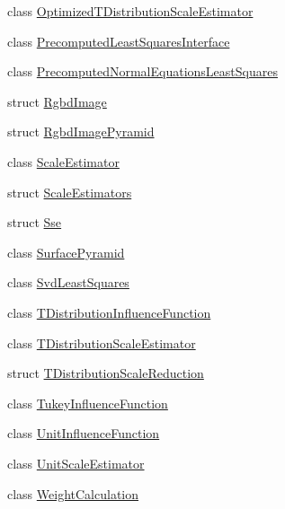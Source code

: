 \begin{DoxyCompactItemize}
\item 
class \mbox{\hyperlink{classdvo_1_1core_1_1_optimized_t_distribution_scale_estimator}{Optimized\+T\+Distribution\+Scale\+Estimator}}
\item 
class \mbox{\hyperlink{classdvo_1_1core_1_1_precomputed_least_squares_interface}{Precomputed\+Least\+Squares\+Interface}}
\item 
class \mbox{\hyperlink{classdvo_1_1core_1_1_precomputed_normal_equations_least_squares}{Precomputed\+Normal\+Equations\+Least\+Squares}}
\item 
struct \mbox{\hyperlink{structdvo_1_1core_1_1_rgbd_image}{Rgbd\+Image}}
\item 
struct \mbox{\hyperlink{structdvo_1_1core_1_1_rgbd_image_pyramid}{Rgbd\+Image\+Pyramid}}
\item 
class \mbox{\hyperlink{classdvo_1_1core_1_1_scale_estimator}{Scale\+Estimator}}
\item 
struct \mbox{\hyperlink{structdvo_1_1core_1_1_scale_estimators}{Scale\+Estimators}}
\item 
struct \mbox{\hyperlink{structdvo_1_1core_1_1_sse}{Sse}}
\item 
class \mbox{\hyperlink{classdvo_1_1core_1_1_surface_pyramid}{Surface\+Pyramid}}
\item 
class \mbox{\hyperlink{classdvo_1_1core_1_1_svd_least_squares}{Svd\+Least\+Squares}}
\item 
class \mbox{\hyperlink{classdvo_1_1core_1_1_t_distribution_influence_function}{T\+Distribution\+Influence\+Function}}
\item 
class \mbox{\hyperlink{classdvo_1_1core_1_1_t_distribution_scale_estimator}{T\+Distribution\+Scale\+Estimator}}
\item 
struct \mbox{\hyperlink{structdvo_1_1core_1_1_t_distribution_scale_reduction}{T\+Distribution\+Scale\+Reduction}}
\item 
class \mbox{\hyperlink{classdvo_1_1core_1_1_tukey_influence_function}{Tukey\+Influence\+Function}}
\item 
class \mbox{\hyperlink{classdvo_1_1core_1_1_unit_influence_function}{Unit\+Influence\+Function}}
\item 
class \mbox{\hyperlink{classdvo_1_1core_1_1_unit_scale_estimator}{Unit\+Scale\+Estimator}}
\item 
class \mbox{\hyperlink{classdvo_1_1core_1_1_weight_calculation}{Weight\+Calculation}}
\end{DoxyCompactItemize}
